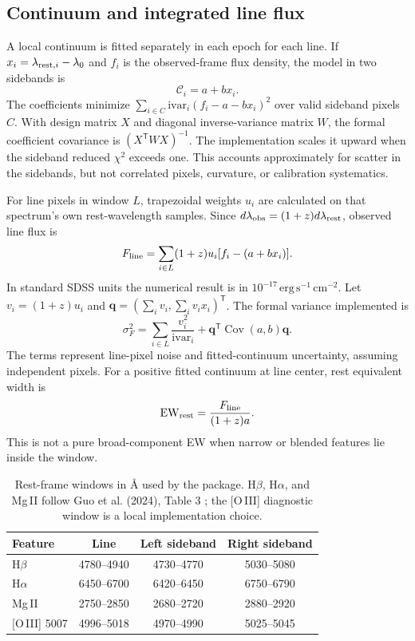 \documentclass[11pt,a4paper]{article}
\begin{document}
\subsection{Continuum and integrated line flux}
A local continuum is fitted separately in each epoch for each line. If $x_i=\lambda_{{\rm rest},i}-\lambda_0$ and $f_i$ is the observed-frame flux density, the model in two sidebands is
\begin{equation}
\mathcal{C}_i=a+b x_i .
\label{eq:cont}
\end{equation}
The coefficients minimize $\sum_{i\in C}\mathrm{ivar}_i(f_i-a-bx_i)^2$ over valid sideband pixels $C$. With design matrix $X$ and diagonal inverse-variance matrix $W$, the formal coefficient covariance is $(X^{\mathsf T}WX)^{-1}$. The implementation scales it upward when the sideband reduced $\chi^2$ exceeds one. This accounts approximately for scatter in the sidebands, but not correlated pixels, curvature, or calibration systematics.

For line pixels in window $L$, trapezoidal weights $u_i$ are calculated on that spectrum's own rest-wavelength samples. Since $d\lambda_{\rm obs}=(1+z)d\lambda_{\rm rest}$, observed line flux is
\begin{equation}
F_{\rm line}=\sum_{i\in L}(1+z)u_i[f_i-(a+bx_i)].
\label{eq:flux}
\end{equation}
In standard SDSS units the numerical result is in $10^{-17}\,\mathrm{erg\,s^{-1}\,cm^{-2}}$. Let $v_i=(1+z)u_i$ and $\mathbf{q}=(\sum_i v_i,\sum_i v_i x_i)^{\mathsf T}$. The formal variance implemented is
\begin{equation}
\sigma_F^2=\sum_{i\in L}\frac{v_i^2}{\mathrm{ivar}_i}
+\mathbf{q}^{\mathsf T}\operatorname{Cov}(a,b)\mathbf{q}.
\label{eq:variance}
\end{equation}
The terms represent line-pixel noise and fitted-continuum uncertainty, assuming independent pixels. For a positive fitted continuum at line center, rest equivalent width is
\begin{equation}
{\rm EW}_{\rm rest}=\frac{F_{\rm line}}{(1+z)a}.
\label{eq:ew}
\end{equation}
This is not a pure broad-component EW when narrow or blended features lie inside the window.

\begin{table}[htbp]
\centering
\caption{Rest-frame windows in \AA{} used by the package. H$\beta$, H$\alpha$, and Mg\,II follow Guo et al. (2024), Table 3 \cite{guo2024}; the [O\,III] diagnostic window is a local implementation choice.}
\label{tab:windows}
\begin{tabular}{lccc}
\toprule
Feature & Line & Left sideband & Right sideband \\
\midrule
H$\beta$ & 4780--4940 & 4730--4770 & 5030--5080 \\
H$\alpha$ & 6450--6700 & 6420--6450 & 6750--6790 \\
Mg\,II & 2750--2850 & 2680--2720 & 2880--2920 \\
{[O\,III]} 5007 & 4996--5018 & 4970--4990 & 5025--5045 \\
\bottomrule
\end{tabular}
\end{table}
\end{document}

